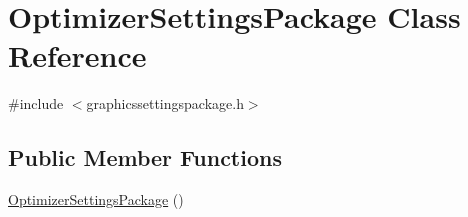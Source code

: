 \hypertarget{class_optimizer_settings_package}{}\section{Optimizer\+Settings\+Package Class Reference}
\label{class_optimizer_settings_package}


{\ttfamily \#include $<$graphicssettingspackage.\+h$>$}

\subsection*{Public Member Functions}
\begin{DoxyCompactItemize}
\item 
\hyperlink{class_optimizer_settings_package_a9562747ebfbde1cbda03fee425d886af}{Optimizer\+Settings\+Package} ()\hypertarget{class_optimizer_settings_package_a9562747ebfbde1cbda03fee425d886af}{}\label{class_optimizer_settings_package_a9562747ebfbde1cbda03fee425d886af}


\end{DoxyCompactItemize}
